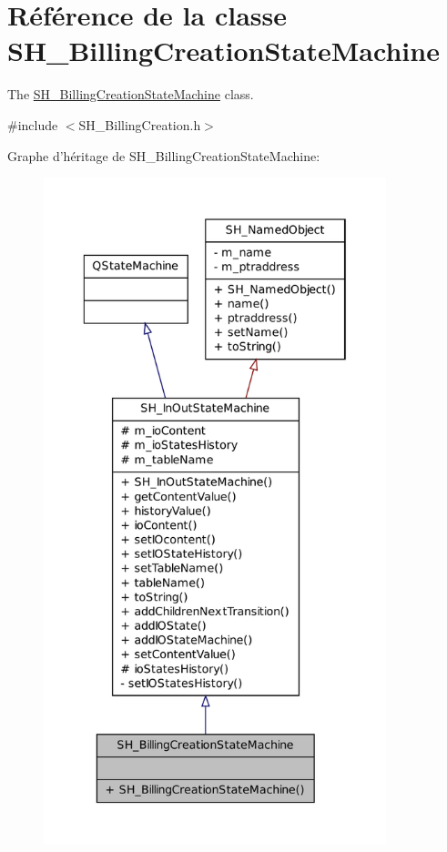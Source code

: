 \hypertarget{classSH__BillingCreationStateMachine}{\section{Référence de la classe S\-H\-\_\-\-Billing\-Creation\-State\-Machine}
\label{classSH__BillingCreationStateMachine}
}


The \hyperlink{classSH__BillingCreationStateMachine}{S\-H\-\_\-\-Billing\-Creation\-State\-Machine} class.  




{\ttfamily \#include $<$S\-H\-\_\-\-Billing\-Creation.\-h$>$}



Graphe d'héritage de S\-H\-\_\-\-Billing\-Creation\-State\-Machine\-:
\nopagebreak
\begin{figure}[H]
\begin{center}
\leavevmode
\includegraphics[height=550pt]{classSH__BillingCreationStateMachine__inherit__graph}
\end{center}
\end{figure}


